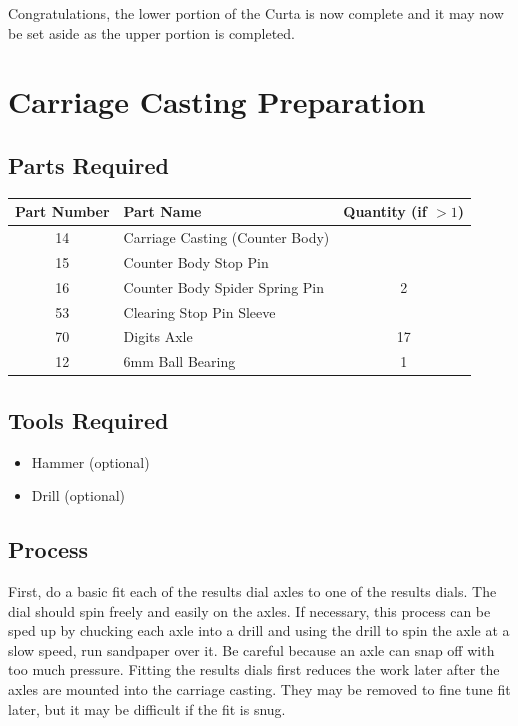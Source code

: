 \documentclass[openany]{book}
\begin{document}
Congratulations, the lower portion of the Curta is now complete and it may now be set aside as the upper portion is completed.





\chapter{Carriage Casting Preparation}
\section{Parts Required}
\begin{table}[!ht]
	\centering
	\begin{tabular}{clc}
		Part Number & Part Name & Quantity (if $>1$) \\ \hline
		14 & Carriage Casting (Counter Body) & \\
		15 & Counter Body Stop Pin & \\
		16 & Counter Body Spider Spring Pin & 2 \\
		53 & Clearing Stop Pin Sleeve & \\
		70 & Digits Axle & 17 \\ \hline \hline
		12 & 6mm Ball Bearing & 1
	\end{tabular}
\end{table}

\section{Tools Required}
\begin{itemize}
	\item Hammer (optional)
	\item Drill (optional)
\end{itemize}



\section{Process}
First, do a basic fit each of the results dial axles to one of the results dials. The dial should spin freely and easily on the axles. If necessary, this process can be sped up by chucking each axle into a drill and using the drill to spin the axle at a slow speed, run sandpaper over it. Be careful because an axle can snap off with too much pressure. Fitting the results dials first reduces the work later after the axles are mounted into the carriage casting. They may be removed to fine tune fit later, but it may be difficult if the fit is snug.
\end{document}
